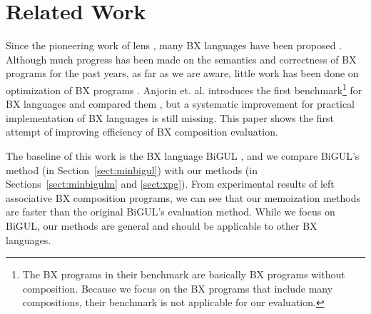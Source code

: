 \section{Related Work} \label{sect:related}


Since the pioneering work of lens \cite{Foster:2007:CBT:1232420.1232424}, many BX languages have been proposed \cite{Bohannon06relationallenses:, Bohannon:2008:BRL:1328438.1328487,Buchmann:2018:BFI:3362232.3362263,Ko:2016:BFV:2847538.2847544,LeblebiciAS14,Samimi-Dehkordi18,Cicchetti2011,Hinkel:2019:CPB:3318595.3318634}.
Although much progress has been made on the semantics and correctness of BX programs for the past years, as far as we are aware, little work has been done on optimization of BX programs \cite{Horn:2018:IRL:3243631.3236769}. Anjorin et. al. introduces the first benchmark\footnote{The BX programs in their benchmark are basically BX programs without composition. Because we focus on the BX programs that include many compositions, their benchmark is not applicable for our evaluation.} for BX languages and compared them \cite{Anjorin2019}, but a systematic improvement for practical implementation of BX languages is still missing. This paper shows the first attempt of improving efficiency of BX composition evaluation.

The baseline of this work is the BX language BiGUL \cite{Ko:2016:BFV:2847538.2847544, Ko:2017:ABB:3177123.3158129}, and we compare BiGUL's method (in Section~\ref{sect:minbigul}) with our methods (in Sections~\ref{sect:minbigulm} and \ref{sect:xpg}). From experimental results of left associative BX composition programs, we can see that our memoization methods are faster than the original BiGUL's evaluation method.
While we focus on BiGUL, our methods are general and should be applicable to other BX languages.


